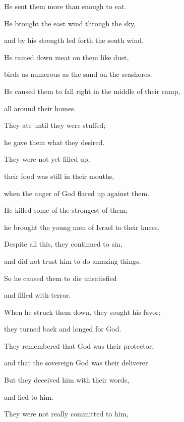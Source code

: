 {\par }{\Q He sent
them
more than enough
to eat.
\par }{\Q {}He brought
the east wind
through the sky,
\par }{\Q and by his strength
led
forth the south wind.
\par }{\Q {}He rained down
meat
on
them like dust,
\par }{\Q birds
as numerous as the sand
on the seashores.
\par }{\Q {}He caused them to fall
right in the middle
of their camp,
\par }{\Q all around
their homes.
\par }{\Q {}They ate
until they were
stuffed;
\par }{\Q he gave
them what they
desired.
\par }{\Q {}They were not
yet filled up,
\par }{\Q their food
was still
in their mouths,
\par }{\Q {}when the anger
of God
flared up against
them.
\par }{\Q He killed
some of the strongest
of them;
\par }{\Q he brought the young men
of Israel
to their knees.
\par }{\Q {}Despite all
this,
they continued
to sin,
\par }{\Q and did not
trust
him to do amazing things.
\par }{\Q {}So he caused
them to die
unsatisfied
\par }{\Q and filled with terror.
\par }{\Q {}When
he struck
them down, they sought
his favor;

\par }{\Q they turned back
and longed
for God.
\par }{\Q {}They remembered
that
God
was their protector,
\par }{\Q and that the sovereign
God
was their deliverer.
\par }{\Q {}But they deceived
him with their words,
\par }{\Q and lied to him.
\par }{\Q {}They were not
really committed
to
him,

}
